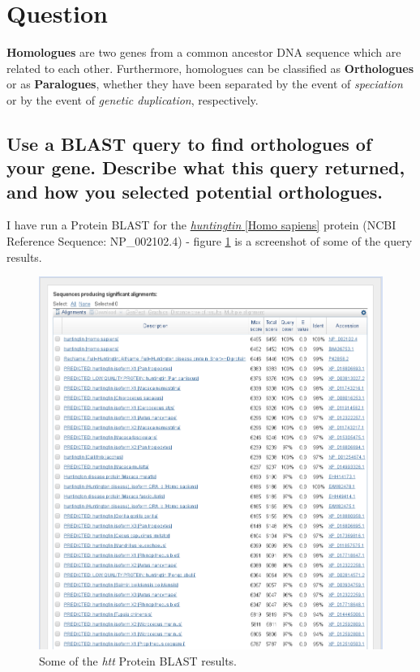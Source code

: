 \section{Question}

\textbf{Homologues} are two genes from a common ancestor DNA sequence which are related to each other. Furthermore, homologues can be classified as \textbf{Orthologues} or as \textbf{Paralogues}, whether they have been separated by the event of \textit{speciation} or by the event of \textit{genetic duplication}, respectively.

\subsection{Use a BLAST query to find orthologues of your gene. Describe what this query returned, and how you selected potential orthologues.}


I have run a Protein BLAST for the \href{https://www.ncbi.nlm.nih.gov/gene/3064}{\textit{huntingtin} [Homo sapiens]} protein (NCBI Reference Sequence: NP\_002102.4) - figure \ref{fig:htt-blastp-results} is a screenshot of some of the query results.

\begin{figure}[ht]
    \centering
    \includegraphics[width=\linewidth]{res/htt-blastp-results.png}
    \caption{Some of the \textit{htt} Protein BLAST results.}
    \label{fig:htt-blastp-results}
\end{figure}


